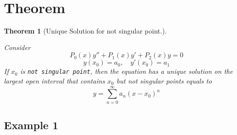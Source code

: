 \documentclass[
  letterpaper,
  DIV=11,
  numbers=noendperiod]{scrreprt}
\theoremstyle{plain}
\newtheorem{theorem}{Theorem}[chapter]
\theoremstyle{remark}
\begin{document}
\section{Theorem}\label{theorem-4}

\begin{tcolorbox}[enhanced jigsaw, title=\textcolor{quarto-callout-note-color}{\faInfo}\hspace{0.5em}{Note}, colbacktitle=quarto-callout-note-color!10!white, opacitybacktitle=0.6, opacityback=0, rightrule=.15mm, breakable, titlerule=0mm, colback=white, bottomtitle=1mm, colframe=quarto-callout-note-color-frame, toprule=.15mm, leftrule=.75mm, toptitle=1mm, arc=.35mm, bottomrule=.15mm, left=2mm, coltitle=black]

\begin{theorem}[Unique Solution for not singular
point.]\protect\hypertarget{thm-singpoint}{}\label{thm-singpoint}

Consider \[P_0(x)y''+P_1(x)y'+P_2(x)y=0\]
\[ y(x_0)=a_0,\quad y'(x_0)=a_1\] If \(x_0\) is
\texttt{not\ singular\ point}, then the equation has a unique solution
on the largest open interval that contains \(x_0\) but not singular
points equals to \[y=\sum_{n=0}^\infty a_n(x-x_0)^n\]

\end{theorem}

\end{tcolorbox}

\subsection{Example 1}\label{example-1-1}
\end{document}
